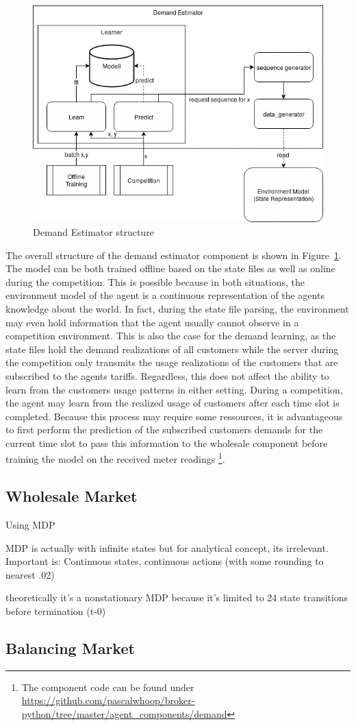 \begin{figure}[h]
	\centering
	\includegraphics[width=0.8\linewidth]{img/UsageEstimator.png}
	\caption{Demand Estimator structure}
	\label{fig:DemandEstimator}
\end{figure}


The overall structure of the demand estimator component is shown in Figure~\ref{fig:DemandEstimator}. The model can be both trained offline based on the state files as well as online during the competition. This is possible because in both situations, the environment model of the agent is a continuous representation of the agents knowledge about the world. In fact, during the state file parsing, the environment may even hold information that the agent usually cannot observe in a competition environment. This is also the case for the demand learning, as the state files hold the demand realizations of all customers while the server during the competition only transmits the usage realizations of the customers that are subscribed to the agents tariffs. Regardless, this does not affect the ability to learn from the customers usage patterns in either setting. During a competition, the agent may learn from the realized usage of customers after each time slot is completed. Because this process may require some ressources, it is advantageous to first perform the prediction of the subscribed customers demands for the current time slot to pass this information to the wholesale component before training the model on the received meter readings
\footnote{The component code can be found under \url{https://github.com/pascalwhoop/broker-python/tree/master/agent_components/demand}}.


\subsection{Wholesale Market}

Using \ac {MDP} 

\ac {MDP} is actually with infinite states but for analytical concept, its irrelevant. Important is: Continuous states,
continuous actions (with some rounding to nearest .02)

theoretically it's a nonstationary \ac {MDP} because it's limited to 24 state transitions before termination (t-0)

\subsection{Balancing Market}
